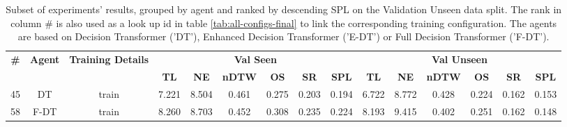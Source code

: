 \begin{table}
\centering
\caption{\label{tab:rezero}Subset of experiments' results, grouped by agent and ranked by descending SPL on the Validation Unseen data split. The rank in column \# is also used as a look up id in table \ref{tab:all-configs-final} to link the corresponding training configuration.     \newline The agents are based on Decision Transformer ('DT'), Enhanced Decision Transformer ('E-DT') or Full Decision Transformer ('F-DT').}
\begin{tabular}{@{\hskip3pt}c@{\hskip3pt}c@{\hskip3pt}c@{\hskip3pt}c@{\hskip3pt}c@{\hskip3pt}c@{\hskip3pt}c@{\hskip3pt}c@{\hskip3pt}c@{\hskip3pt}c@{\hskip3pt}c@{\hskip3pt}c@{\hskip3pt}c@{\hskip3pt}c@{\hskip3pt}c}
\toprule
\textbf{\#} & \textbf{Agent} & \textbf{Training Details} & \multicolumn{6}{c}{\textbf{Val Seen}} & \multicolumn{6}{c}{\textbf{Val Unseen}} \\
\cmidrule(l){4-9} \cmidrule(l){10-15} \textbf{~} &     \textbf{~} &                \textbf{~} &       \textbf{TL} & \textbf{NE} & \textbf{nDTW} & \textbf{OS} & \textbf{SR} & \textbf{SPL} &         \textbf{TL} & \textbf{NE} & \textbf{nDTW} & \textbf{OS} & \textbf{SR} & \textbf{SPL} \\
\midrule
         45 &             DT &                     train &             7.221 &       8.504 &         0.461 &       0.275 &       0.203 &        0.194 &               6.722 &       8.772 &         0.428 &       0.224 &       0.162 &        0.153 \\
         58 &           F-DT &                     train &             8.260 &       8.703 &         0.452 &       0.308 &       0.235 &        0.224 &               8.193 &       9.415 &         0.402 &       0.251 &       0.162 &        0.148 \\
\bottomrule
\end{tabular}
\end{table}
